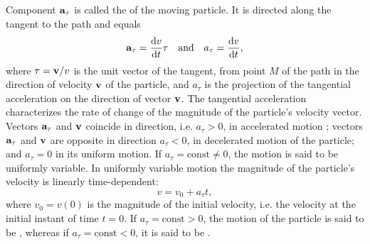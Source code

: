\subsection{}\label{1.4.5} Component $\vb{a}_{\tau}$ is called the  of the moving particle. It is directed along the tangent to the path and equals 
\begin{equation*}%
\vb{a}_{\tau} = \dv{v}{t} \vb{\tau}  \qand  a_{\tau} = \dv{v}{t},
\end{equation*}
where $\vb{\tau} = \vb{v}/v$ is the unit vector of the tangent, from point $M$ of the path in the direction of velocity $\vb{v}$ of the particle, and $a_{\tau}$ is the projection of the tangential acceleration on the direction of vector $\vb{v}$. The tangential acceleration characterizes the rate of change of the magnitude of the particle's velocity vector. Vectors $\vb{a}_{\tau}$ and $\vb{v}$ coincide in direction, i.e. $a_{\tau} > 0$, in accelerat­ed motion ; vectors $\vb{a}_{\tau}$ and $\vb{v}$ are opposite in direction $a_{\tau} < 0$, in decelerated motion of the particle; and $a_{\tau} = 0$ in its uniform motion. If $a_{\tau} = \textrm{const} \neq 0$, the motion is said to be uniformly variable. In uniformly variable motion the magni­tude of the particle's velocity is linearly time-dependent:
\begin{equation*}%
v = v_{0} + a_{\tau}t,
\end{equation*}
where $v_{0} = v (0)$ is the magnitude of the initial velocity, i.e. the velocity at the initial instant of time $t = 0$. If $a_{\tau} = \textrm{const} > 0$, the motion of the particle is said to be , whereas if $a_{\tau} = \textrm{const} < 0$, it is said to be .

